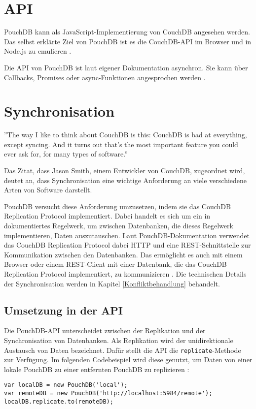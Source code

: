 \section{API}
\label{API}
PouchDB kann als JavaScript-Implementierung von CouchDB angesehen werden. Das selbst erklärte Ziel von PouchDB ist es die CouchDB-API im Browser und in Node.js zu emulieren \cite{pouch:intro}. 

Die API von PouchDB ist laut eigener Dokumentation asynchron. Sie kann über Callbacks, Promises oder async-Funktionen angesprochen werden \cite{pouch:api}.


\section{Synchronisation}
\label{Synchronisation}
\begin{citeenv}
''The way I like to think about CouchDB is this: CouchDB is bad at everything, except syncing. And it turns out that's the most important feature you could ever ask for, for many types of software.'' \cite{pouch:replication}
\end{citeenv}

Das Zitat, dass Jason Smith, einem Entwickler von CouchDB, zugeordnet wird, deutet an, dass Synchronisation eine wichtige Anforderung an viele verschiedene Arten von Software darstellt.

PouchDB versucht diese Anforderung umzusetzen, indem sie das CouchDB Replication Protocol implementiert. Dabei handelt es sich um ein in \cite{apache:replication} dokumentiertes Regelwerk, um zwischen Datenbanken, die dieses Regelwerk implementieren, Daten auszutauschen. Laut PouchDB-Dokumentation verwendet das CouchDB Replication Protocol dabei HTTP und eine REST-Schnittstelle zur Kommunikation zwischen den Datenbanken. Das ermöglicht es auch mit einem Browser oder einem REST-Client mit einer Datenbank, die das CouchDB Replication Protocol implementiert, zu kommunizieren \cite{pouch:intro}. Die technischen Details der Synchronisation werden in Kapitel \ref{Konfliktbehandlung} behandelt.


\subsection*{Umsetzung in der API}
Die PouchDB-API unterscheidet zwischen der Replikation und der Synchronisation von Datenbanken. Als Replikation wird der unidirektionale Austausch von Daten bezeichnet. Dafür stellt die API die \texttt{replicate}-Methode zur Verfügung. Im folgenden Codebeispiel wird diese genutzt, um Daten von einer lokale PouchDB zu einer entfernten PouchDB zu replizieren \cite{pouch:replication}:
\begin{codebox}
\begin{lstlisting}[style=typescript]
var localDB = new PouchDB('local');
var remoteDB = new PouchDB('http://localhost:5984/remote');
localDB.replicate.to(remoteDB);
\end{lstlisting}
\end{codebox}


